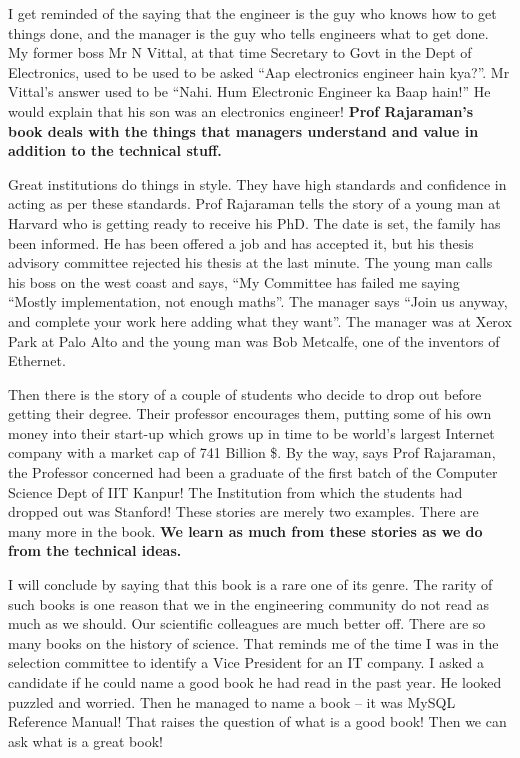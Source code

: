 \begin{multicols}{2}
I get reminded of the saying that the engineer is the guy who knows how to get things done, and the manager is the guy who tells engineers what to get done. My former boss Mr N Vittal, at that time Secretary to Govt in the Dept of Electronics, used to be used to be asked “Aap electronics engineer hain kya?”. Mr Vittal’s answer used to be “Nahi. Hum Electronic Engineer ka Baap hain!” He would explain that his son was an electronics engineer! \textbf{Prof Rajaraman’s book deals with the things that managers understand and value in addition to the technical stuff.}

Great institutions do things in style. They have high standards and confidence in acting as per these standards. Prof Rajaraman tells the story of a young man at Harvard who is getting ready to receive his PhD. The date is set, the family has been informed. He has been offered a job and has accepted it, but his thesis advisory committee rejected his thesis at the last minute. The young man calls his boss on the west coast and says, “My Committee has failed me saying “Mostly implementation, not enough maths”. The manager says “Join us anyway, and complete your work here adding what they want”. The manager was at Xerox Park at Palo Alto and the young man was Bob Metcalfe, one of the inventors of Ethernet.

Then there is the story of a couple of students who decide to drop out before getting their degree. Their professor encourages them, putting some of his own money into their start-up which grows up in time to be world’s largest Internet company with a market cap of 741 Billion \$. By the way, says Prof Rajaraman, the Professor concerned had been a graduate of the first batch of the Computer Science Dept of IIT Kanpur! The Institution from which the students had dropped out was Stanford!  These stories are merely two examples. There are many more in the book. \textbf{We learn as much from these stories as we do from the technical ideas.}

I will conclude by saying that this book is a rare one of its genre. The rarity of such books is one reason that we in the engineering community do not read as much as we should. Our scientific colleagues are much better off. There are so many books on the history of science.  That reminds me of the time I was in the selection committee to identify a Vice President for an IT company. I asked a candidate if he could name a good book he had read in the past year. He looked puzzled and worried. Then he managed to name a book – it was MySQL Reference Manual! That raises the question of what is a good book! Then we can ask what is a great book!


\end{multicols}
